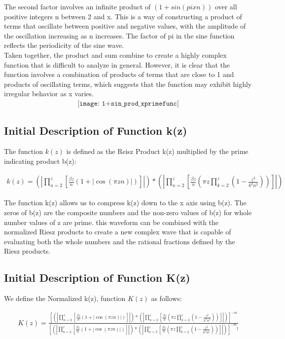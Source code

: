 \documentclass{article}
\begin{document}
The second factor involves an infinite product of $(1 + sin(pixn))$ over all positive integers n between 2 and x. This is a way of constructing a product of terms that oscillate between positive and negative values, with the amplitude of the oscillation increasing as n increases. The factor of pi in the sine function reflects the periodicity of the sine wave. \\

Taken together, the product and sum combine to create a highly complex function that is difficult to analyze in general. However, it is clear that the function involves a combination of products of terms that are close to 1 and products of oscillating terms, which suggests that the function may exhibit highly irregular behavior as x varies. \\

\begin{align*}
\texttt{[image: 1+sin\_prod\_xprimefunc]}
\end{align*}

\subsection*{Initial Description of Function k(z)}
The function $k(z)$ is defined as the Reisz Product k(z) multiplied by the prime indicating product b(z):

\begin{align*}
	k(z) = \left(|\prod_{n=2}^z\left[\frac{\beta z}{n}\left(1 + |\cos\left(\pi z n\right)|\right)\right]|\right)*\left(|\prod_{n=2}^z\left[\frac{\beta z}{n}\left({\pi z}\prod_{k=2}^z\left(1 - \frac{z^2}{k^2n^2}\right)\right)\right]|\right)
\end{align*} 

The function k(z) allows us to compress k(z) down to the x axis using b(z). The zeros of b(z) are the composite numbers and the non-zero values of b(z) for whole number values of z are prime. this waveform can be combined with the normalized Riesz products to create a new complex wave that is capable of evaluating both the whole numbers and the rational fractions defined by the Riesz products.

\subsection*{Initial Description of Function K(z)}
We define the Normalized k(z), function $K(z)$ as follows:

\begin{align*}
	K(z) = \frac{\left[\left(|\prod_{n=2}^z\left[\frac{\beta z}{n}\left(1 + |\cos\left(\pi z n\right)|\right)\right]|\right)*\left(|\prod_{n=2}^z\left[\frac{\beta z}{n}\left({\pi z}\prod_{k=2}^z\left(1 - \frac{z^2}{k^2n^2}\right)\right)\right]|\right)\right]^{-m}}{\left[\left(|\prod_{n=2}^z\left[\frac{\beta z}{n}\left(1 + |\cos\left(\pi z n\right)|\right)\right]|\right)*\left(|\prod_{n=2}^z\left[\frac{\beta z}{n}\left({\pi z}\prod_{k=2}^z\left(1 - \frac{z^2}{k^2n^2}\right)\right)\right]|\right)\right]^{-m}!}
\end{align*}
\end{document}
